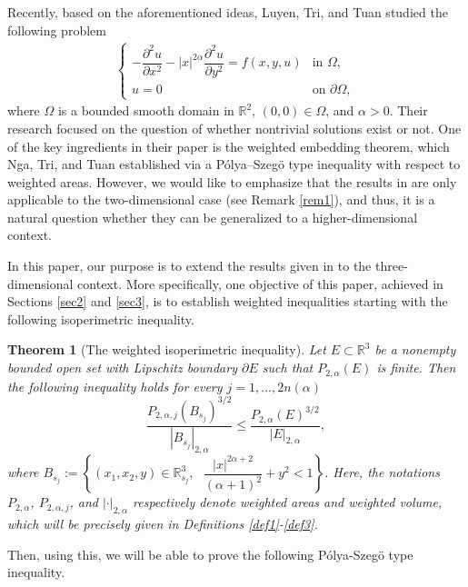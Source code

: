 \documentclass[10pt, reqno]{amsart}
\newtheorem{theorem}{Theorem}
\begin{document}
	Recently, based on the aforementioned ideas, Luyen, Tri, and Tuan \cite{Luyen2} studied the following problem
	\begin{align}\label{eqn1}
		\begin{cases}
			- \dfrac{\partial^2u}{\partial x^2} - |x|^{2\alpha} \dfrac{\partial^2 u}{\partial y^2} = f(x,y,u) & \textrm{in } \Omega, \\
			u = 0 & \textrm{on } \partial \Omega,
		\end{cases}
	\end{align}
	where $\Omega$ is a bounded smooth domain in $\mathbb{R}^2$, $(0,0) \in \Omega $, and $\alpha > 0$. Their research focused on the question of whether nontrivial solutions exist or not. One of the key ingredients in their paper is the weighted embedding theorem, which Nga, Tri, and Tuan \cite{nga} established via a P\'olya–Szeg\"o type inequality with respect to weighted areas. However, we would like to emphasize that the results in \cite{nga, Luyen2} are only applicable to the two-dimensional case (see Remark \ref{rem1}), and thus, it is a natural question whether they can be generalized to a higher-dimensional context. 
	
	In this paper, our purpose is to extend the results given in \cite{nga, Luyen2} to the three-dimensional context. More specifically, one objective of this paper, achieved in Sections \ref{sec2} and \ref{sec3}, is to establish weighted inequalities starting with the following isoperimetric inequality.
	
	\begin{theorem}[The weighted isoperimetric inequality]\label{thm1}
		Let $E \subset \mathbb{R}^3$ be a nonempty bounded open set with Lipschitz boundary $\partial E$ such that $P_{2,\alpha} (E)$ is finite. Then the following inequality holds for every $j=1,...,2n(\alpha)$
		\begin{equation}\label{eqn2}
			\dfrac{P_{2,\alpha,j}(B_{s_j})^{3/2}}{|B_{s_j}|_{2,\alpha}} \leq \dfrac{P_{2,\alpha}(E)^{3/2}}{|E|_{2,\alpha}},
		\end{equation}
		where $B_{s_j} := \left\{ (x_1,x_2,y) \in \mathbb{R}^3_{s_j}, \textrm{ }\dfrac{|x|^{2\alpha+2}}{(\alpha+1)^2} + y^2 < 1 \right\}$. Here, the notations $P_{2,\alpha}$, $P_{2,\alpha,j}$, and $|\cdot|_{2,\alpha}$ respectively denote weighted areas and weighted volume, which will be precisely given in Definitions \ref{def1}-\ref{def3}. 
	\end{theorem}
	
	Then, using this, we will be able to prove the following P\'olya-Szeg\"o type inequality.
	
\end{document}

